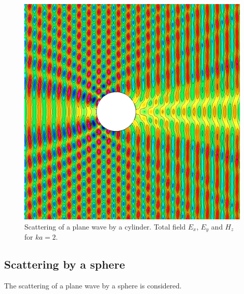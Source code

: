 \begin{figure}
\begin{center}
\includegraphics[width=\figWidth]{figures/scatCyl-cibc2-order4-k4-HzTotal}
\end{center}
\caption{Scattering of a plane wave by a cylinder. Total field $E_x$, $E_y$ and $H_z$ for $k a = 2$.}
\end{figure}



\subsection{Scattering by a sphere}

The scattering of a plane wave by a sphere is considered.

